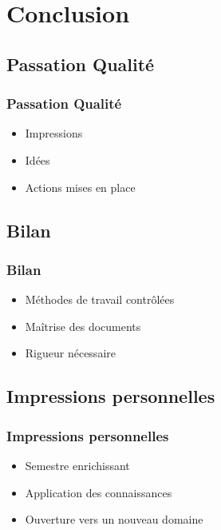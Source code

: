 \documentclass[compress,xcolor=dvipsnames]{beamer}
\begin{document}
\section{Conclusion}
\subsection{Passation Qualité}
\begin{frame}
\frametitle{Passation Qualité}
\begin{itemize}
\item Impressions
\item Idées
\item Actions mises en place
\end{itemize}
\end{frame}

\subsection{Bilan}
\begin{frame}
\frametitle{Bilan}
\begin{itemize}
\item Méthodes de travail contrôlées
\item Maîtrise des documents
\item Rigueur nécessaire
\end{itemize}
\end{frame}

\subsection{Impressions personnelles}
\begin{frame}
\frametitle{Impressions personnelles}
\begin{itemize}
\item Semestre enrichissant
\item Application des connaissances
\item Ouverture vers un nouveau domaine
\end{itemize}
\end{frame}
\end{document}
